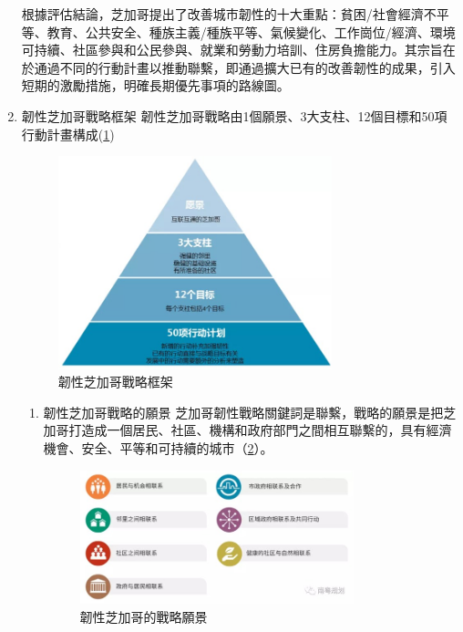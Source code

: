\documentclass[a4paper,12pt]{article}
\begin{document}
\begin{enumerate}
根據評估結論，芝加哥提出了改善城市韌性的十大重點：貧困/社會經濟不平等、教育、公共安全、種族主義/種族平等、氣候變化、工作崗位/經濟、環境可持續、社區參與和公民參與、就業和勞動力培訓、住房負擔能力。其宗旨在於通過不同的行動計畫以推動聯繫，即通過擴大已有的改善韌性的成果，引入短期的激勵措施，明確長期優先事項的路線圖。\\

\item 韌性芝加哥戰略框架
\label{sec:orga923aba}
韌性芝加哥戰略由1個願景、3大支柱、12個目標和50項行動計畫構成(\ref{fig:Chicago-1})\\

\begin{figure}[htbp]
\centering
\includegraphics[width=300]{images/2021-03-24_15-12-51.jpg}
\caption{\label{fig:Chicago-1}韌性芝加哥戰略框架}
\end{figure}

\begin{enumerate}
\item 韌性芝加哥戰略的願景
\label{sec:org82b338b}
芝加哥韌性戰略關鍵詞是聯繫，戰略的願景是把芝加哥打造成一個居民、社區、機構和政府部門之間相互聯繫的，具有經濟機會、安全、平等和可持續的城市（\ref{fig:Chicago-2}）。\\
\begin{figure}[htbp]
\centering
\includegraphics[width=300]{images/2021-03-24_15-17-03.jpg}
\caption{\label{fig:Chicago-2}韌性芝加哥的戰略願景}
\end{figure}


\end{enumerate}
\end{enumerate}
\end{document}
